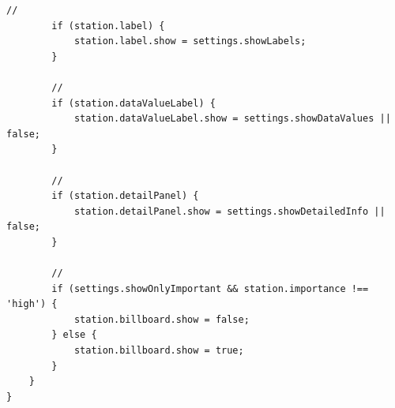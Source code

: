 \begin{lstlisting}[style=javascript]
        // 
        if (station.label) {
            station.label.show = settings.showLabels;
        }
        
        // 
        if (station.dataValueLabel) {
            station.dataValueLabel.show = settings.showDataValues || false;
        }
        
        // 
        if (station.detailPanel) {
            station.detailPanel.show = settings.showDetailedInfo || false;
        }
        
        // 
        if (settings.showOnlyImportant && station.importance !== 'high') {
            station.billboard.show = false;
        } else {
            station.billboard.show = true;
        }
    }
}
\end{lstlisting}

\hypertarget{section-150}{%
\paragraph{}\label{section-150}}

